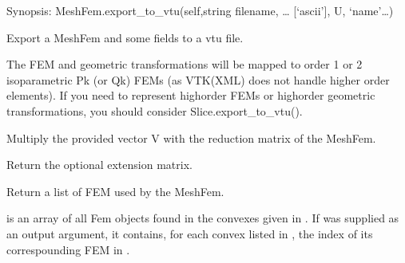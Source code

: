 \documentclass[a4paper,11pt,english]{sphinxmanual}
\begin{document}
\begin{fulllineitems}
\begin{fulllineitems}
\label{\detokenize{python/cmdref_MeshFem:getfem.MeshFem.export_to_vtu}}
Synopsis: MeshFem.export\_to\_vtu(self,string filename, … {[}‘ascii’{]}, U, ‘name’…)

Export a MeshFem and some fields to a vtu file.

The FEM and geometric transformations will be mapped to order 1
or 2 isoparametric Pk (or Qk) FEMs (as VTK(XML) does not handle higher
order elements). If you need to represent high\sphinxhyphen{}order FEMs or
high\sphinxhyphen{}order geometric transformations, you should consider
Slice.export\_to\_vtu().

\end{fulllineitems}


\begin{fulllineitems}
\label{\detokenize{python/cmdref_MeshFem:getfem.MeshFem.extend_vector}}
Multiply the provided vector V with the reduction matrix of the MeshFem.

\end{fulllineitems}


\begin{fulllineitems}
\label{\detokenize{python/cmdref_MeshFem:getfem.MeshFem.extension_matrix}}
Return the optional extension matrix.

\end{fulllineitems}


\begin{fulllineitems}
\label{\detokenize{python/cmdref_MeshFem:getfem.MeshFem.fem}}
Return a list of FEM used by the MeshFem.

 is an array of all Fem objects found in the convexes
given in . If  was supplied as an output argument,
it contains, for each convex listed in , the index of its
correspounding FEM in .


\end{fulllineitems}
\end{fulllineitems}
\end{document}
